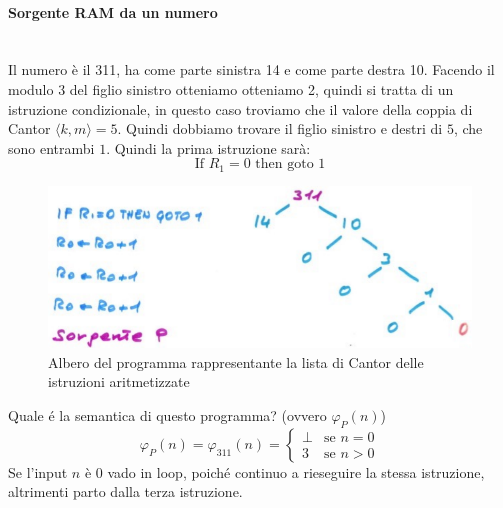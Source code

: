 \documentclass{article}
\begin{document}
\paragraph{Sorgente RAM da un numero}\mbox{}\\
Il numero è il 311, ha come parte sinistra 14 e come parte destra 10. Facendo il modulo 3
del figlio sinistro otteniamo otteniamo 2, quindi si tratta di un istruzione condizionale,
in questo caso troviamo che il valore della coppia di Cantor $\langle k,m\rangle = 5$. Quindi
dobbiamo trovare il figlio sinistro e destri di $5$, che sono entrambi $1$. Quindi
la prima istruzione sarà:
$$\text{If }R_1=0\text{ then goto }1$$
\begin{figure}[H]
    \centering
    \includegraphics[scale=0.4]{images/sorgente_p.png}
    \caption{Albero del programma rappresentante la lista di Cantor delle istruzioni aritmetizzate}
\end{figure}
Quale é la semantica di questo programma? (ovvero $\varphi_P(n)$)
\[
    \varphi_P(n)=\varphi_{311}(n)=
    \begin{cases}
        \bot & \text{se }n=0 \\
        3    & \text{se }n>0
    \end{cases}
\]
Se l'input $n$ è 0 vado in loop, poiché continuo a rieseguire la stessa istruzione,
altrimenti parto dalla terza istruzione.
\end{document}
